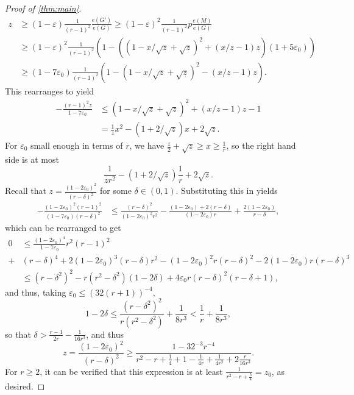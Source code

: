 \documentclass[12pt]{amsart}
\theoremstyle{definition}
\numberwithin{equation}{section}
\begin{document}
\begin{proof}[Proof of \cref{thm:main}]
    \begin{align*}
        z&\ge (1-\varepsilon)\frac{1}{(r-1)^2}\frac{e(G')}{e(G)}\ge (1-\varepsilon)^2 \frac{1}{(r-1)^2}p \frac{e(M)}{e(G)}\\
        &\ge (1-\varepsilon)^2\frac{1}{(r-1)^2}(1-((1-x/\sqrt{z}+\sqrt{z})^2+(x/z-1)z)(1+5\varepsilon_0))\\
        &\ge (1-7\varepsilon_0)\frac{1}{(r-1)^2}(1-(1-x/\sqrt{z}+\sqrt{z})^2-(x/z-1)z).
    \end{align*}
    This rearranges to yield 
    \begin{align*}
        -\frac{(r-1)^2z}{1-7\varepsilon_0}&\le (1-x/\sqrt{z}+\sqrt{z})^2+(x/z-1)z-1\\
        &=\frac{1}{z}x^2-(1+2/\sqrt{z})x+2\sqrt{z}.
    \end{align*}
    For $\varepsilon_0$ small enough in terms of $r$, we have $\frac{z}{2}+\sqrt{z}\ge x\ge \frac{1}{r}$, so the right hand side is at most
    \[
        \frac{1}{zr^2}-(1+2/\sqrt{z})\frac{1}{r}+2\sqrt{z}.
    \]
    Recall that $z = \frac{(1-2\varepsilon_0)^2}{(r-\delta)^2}$ for some $\delta\in(0,1)$. Substituting this in yields
    \begin{align*}
        -\frac{(1-2\varepsilon_0)^2(r-1)^2}{(1-7\varepsilon_0)(r-\delta)^2} &\le \frac{(r-\delta)^2}{(1-2\varepsilon_0)^2r^2} - \frac{(1-2\varepsilon_0)+2(r-\delta)}{(1-2\varepsilon_0)r}+\frac{2(1-2\varepsilon_0)}{r-\delta},
    \end{align*}
    which can be rearranged to get 
    \begin{align*}
        0&\le \frac{(1-2\varepsilon_0)^4}{1-7\varepsilon_0}r^2(r-1)^2\\
        +&(r-\delta)^4+2(1-2\varepsilon_0)^3(r-\delta)r^2-(1-2\varepsilon_0)^2r(r-\delta)^2-2(1-2\varepsilon_0)r(r-\delta)^3 \\
        &\le (r-\delta^2)^2-r(r^2-\delta^2)(1-2\delta)+4\varepsilon_0 r(r-\delta)^2(r-\delta+1),
    \end{align*}
    and thus, taking $\varepsilon_0\le (32(r+1))^{-4}$,
    \[
        1-2\delta \le \frac{(r-\delta^2)^2}{r(r^2-\delta^2)}+\frac{1}{8r^3}< \frac{1}{r}+\frac{1}{8r^3},
    \]
    so that $\delta >\frac{r-1}{2r}-\frac{1}{16r^3}$, and thus
    \[
        z=\frac{(1-2\varepsilon_0)^2}{(r-\delta)^2}\ge \frac{1-32^{-3}r^{-4}}{r^2-r+\frac{1}{4}+1-\frac{1}{4r}+\frac{1}{4r^2}+2\frac{r}{16r^3}}.
    \]
    For $r\ge 2$, it can be verified that this expression is at least $\frac{1}{r^2-r+\frac{5}{4}}=z_0$, as desired.
\end{proof}
\end{document}
